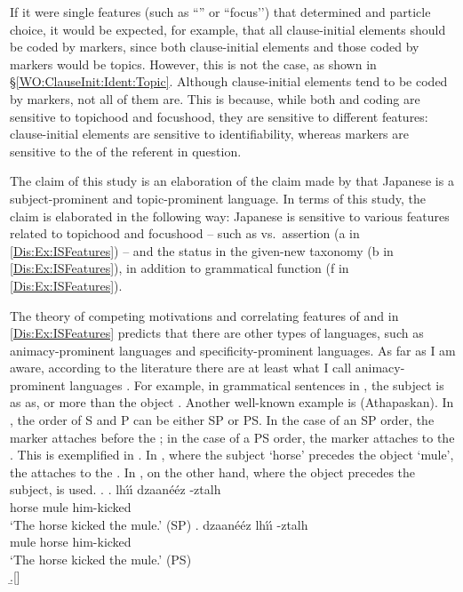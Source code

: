 If it were single features (such as ``'' or ``focus’’) that determined  and particle choice, it would be expected, for example, that all clause-initial elements should be coded by  markers, since both clause-initial elements and those coded by  markers would be topics.
However, this is not the case,
as shown in \S \ref{WO:ClauseInit:Ident:Topic}.
Although clause-initial elements tend to be coded by  markers,
not all of them are.
This is because, while both  and  coding are sensitive to topichood and focushood, they are sensitive to different features: clause-initial elements are sensitive to identifiability,
whereas  markers are sensitive to the  of the referent in question.

The claim of this study is an elaboration of the claim made by
 that
Japanese is a subject-prominent and topic-prominent language.
In terms of this study,
the claim is elaborated in the following way: 
Japanese is sensitive to various features related to topichood and focushood -- such as  vs.~assertion (a in \ref{Dis:Ex:ISFeatures}) --
and the status in the given-new taxonomy (b in \ref{Dis:Ex:ISFeatures}),
in addition to grammatical function (f in \ref{Dis:Ex:ISFeatures}).

The theory of competing motivations and correlating features of  and  in \ref{Dis:Ex:ISFeatures} predicts that there are other types of languages, such as animacy-prominent languages and specificity-prominent languages.
As far as I am aware, according to the literature  there are at least what I call animacy-prominent languages \cite[]{dahlfraurud96,minkoff00,deswartetal07}.
For example, in grammatical sentences in ,
the subject is as  as, or more  than the object \cite{minkoff00}.
Another well-known example is  (Athapaskan).
In , the order of S and P can be either SP or PS.
In the case of an SP order, the marker  attaches before the ;
in the case of a PS order, the marker  attaches to the  \cite{hale72,frischberg72}.
This is exemplified in \Next.
In \Next[a],
where the subject `horse' precedes the object `mule',
the   attaches to the .
In \Next[b], on the other hand,
where the object precedes the subject,
 is used.
%
\ex.
 \ag. lh\'{\i}\'{\i} dzaan\'e\'ez -ztalh \\
      horse mule him-kicked \\
      `The horse kicked the mule.' \hfill{(SP)}
 \bg. dzaan\'e\'ez lh\'{\i}\'{\i} -ztalh \\
      mule horse him-kicked \\
      `The horse kicked the mule.' \hfill{(PS)}\\
 \b.[] \hfill{\cite[300]{hale72}}

